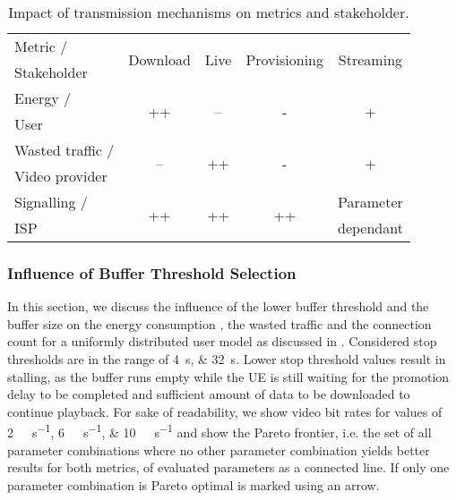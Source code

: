 \begin{table}
  \centering
  \begin{tabular}{lcccc}
    \toprule
    Metric /& \multirow{2}{*}{Download} & \multirow{2}{*}{Live} & \multirow{2}{*}{Provisioning} & \multirow{2}{*}{Streaming}\\
    Stakeholder & & & &\\
    \midrule
    Energy /       & \multirow{2}{*}{++}       & \multirow{2}{*}{--}   & \multirow{2}{*}{-} & \multirow{2}{*}{+}\\
    User & & & &\\
    Wasted traffic / & \multirow{2}{*}{--} & \multirow{2}{*}{++} & \multirow{2}{*}{-} & \multirow{2}{*}{+} \\
    Video provider & & & &\\
    Signalling /& \multirow{2}{*}{++} & \multirow{2}{*}{++} & \multirow{2}{*}{++} & Parameter\\
    \gls{ISP} & & & &dependant\\
    \bottomrule
  \end{tabular}
  \caption{Impact of transmission mechanisms on metrics and stakeholder.}
  \label{tab:application:lte_video:trade_offs:mechanism_selection:lessons_learned}
\end{table}

\subsubsection*{Influence of Buffer Threshold Selection}\label{sec:application:lte_video:trade_offs:buffer_threshold_influence}

In this section, we discuss the influence of the lower buffer threshold \bufferlower and the buffer size \buffersize on the energy consumption \energyconsumption, the wasted traffic \meanwastedtraffic and the connection count \connectioncount for a uniformly distributed user model as discussed in .
Considered stop thresholds are in the range of \SIlist{4;32}{\second}.
Lower stop threshold values result in stalling, as the buffer runs empty while the \gls{UE} is still waiting for the promotion delay to be completed and sufficient amount of data to be downloaded to continue playback.
For sake of readability, we show video bit rates \bitrate for values of \SIlist{2;6;10}{\mega\bit\per\second} and show the Pareto frontier, i.e. the set of all parameter combinations where no other parameter combination yields better results for both metrics, of evaluated parameters as a connected line.
If only one parameter combination is Pareto optimal is marked using an arrow.

